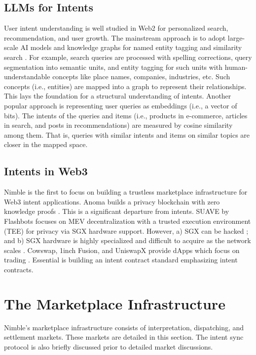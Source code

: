 \documentclass[11pt,letterpaper,twocolumn]{article}
\begin{document}
\subsection{LLMs for Intents}

User intent understanding is well studied in Web2 for personalized search, recommendation, and user growth.
The mainstream approach is to adopt large-scale AI models and knowledge graphs
for named entity tagging and similarity search \cite{vaswani2017attention, wang2023gpt, zou2020survey, ArchImpl19, DLRM19, QuoRemTrick19}.
For example, search queries are processed with spelling corrections,
query segmentation into semantic units, and entity tagging for
such units with human-understandable concepts like place names,
companies, industries, etc. Such concepts (i.e., entities)
are mapped into a graph to represent their relationships. This lays the foundation for a structural
understanding of intents. Another popular approach is representing user queries as embeddings (i.e., a
vector of bits). The intents of the queries and items (i.e., products in e-commerce, articles in
search, and posts in recommendations) are measured by cosine similarity among them. That is, queries with similar
intents and items on similar topics are closer in the mapped space.

\subsection{Intents in Web3}

Nimble is the first to focus on building a trustless marketplace infrastructure
for Web3 intent applications. Anoma builds a privacy blockchain with zero knowledge proofs \cite{anoma2023privacychaincoindesknews}. This is a significant departure from
intents. SUAVE by Flashbots focuses on MEV decentralization with a trusted
execution environment (TEE) for privacy via SGX hardware support. However,
a) SGX can be hacked \cite{murdock2020plundervolt}; and
b) SGX hardware is highly specialized and difficult to acquire as the network scales \cite{severinsen2017secure}. Cowswap, 1inch Fusion, and UniswapX provide dApps which focus on trading \cite{cow2023, 1inchfusion2023, uniswapx2023}. Essential is
building an intent contract standard \cite{essential2023standard} emphasizing intent contracts.

\section{The Marketplace Infrastructure}
\label{sec:marketplace}
Nimble's marketplace infrastructure consists of interpretation, dispatching, and settlement markets. These markets are detailed in this section. The intent sync protocol is also briefly discussed prior to detailed market discussions.
\end{document}
